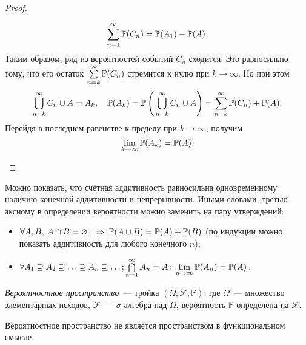 \begin{proof}
\begin{enumerate}
\begin{gather*}
            \sum\limits_{n=1}^{\infty} {\mathbb{P}(C_n)} = {\mathbb{P}(A_1)} - {\mathbb{P}(A)}.
        \end{gather*}
        Таким образом, ряд из вероятностей событий $C_n$ сходится. 
        Это равносильно тому, что его остаток $\sum\limits_{n=k}^{\infty} {\mathbb{P}(C_n)}$ стремится к нулю при $k \rightarrow \infty$. 
        Но при этом
        \begin{equation*}
            \bigcup\limits_{n = k}^{\infty} C_n \cup A = A_k, \quad {\mathbb{P}(A_k)} = \mathbb{P}\left(\, {\bigcup\limits_{n = k}^{\infty} C_n \cup A} \right) = \sum\limits_{n=k}^{\infty} {\mathbb{P}(C_n)} + {\mathbb{P}(A)}.
        \end{equation*}
        Перейдя в последнем равенстве к пределу при $k \rightarrow \infty$, получим
        $$ \lim\limits_{k \to \infty} {\mathbb{P}(A_k)} = {\mathbb{P}(A)}.$$
\end{enumerate}
\end{proof}

\begin{rmrk}
    Можно показать, что счётная аддитивность равносильна одновременному наличию конечной аддитивности и непрерывности. 
    Иными словами, третью аксиому в определении вероятности можно заменить на пару утверждений:
    \begin{itemize}
        \item 
            $\forall A, B, \: A \cap B = \varnothing \colon \Rightarrow \; {\mathbb{P}(A \cup B)} = {\mathbb{P}(A)} + {\mathbb{P}(B)}$ 
            (по индукции можно показать аддитивность для любого конечного $n$);
        \item 
            $\forall A_1 \supseteq A_2 \supseteq \ldots \supseteq A_n \supseteq \ldots; \bigcap\limits_{n = 1}^{\infty} A_n = A \colon \lim\limits_{n \to \infty}{\mathbb{P}(A_n)} = {\mathbb{P}(A)}$.
    \end{itemize}
\end{rmrk}

\hypertarget{prob_space}{}
\begin{defn}
    \textit{Вероятностное пространство}~--- тройка $(\Omega, \mathcal{F}, \mathbb{P})$, где $\Omega$~--- множество элементарных исходов, 
    $\mathcal{F}$~--- $\sigma$-алгебра над $\Omega$, вероятность $\mathbb{P}$ определена на $\mathcal{F}$.
\end{defn}
\begin{rmrk}
    Вероятностное пространство не является пространством в функциональном смысле.
\end{rmrk}

